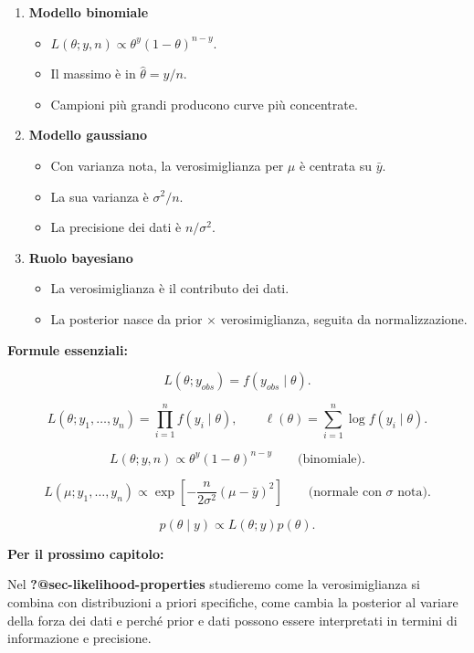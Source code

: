 \documentclass[
  italian,
  letterpaper,
  a4paper,
  11pt,
  open=any]{scrbook}
\providecommand{\tightlist}{%
  \setlength{\itemsep}{0pt}\setlength{\parskip}{0pt}}
\theoremstyle{plain}
\theoremstyle{definition}
\theoremstyle{definition}
\theoremstyle{remark}
\begin{document}
\begin{tcolorbox}
\begin{enumerate}
  \begin{itemize}
  \tightlist
  \item
    Le verosimiglianze si moltiplicano.
  \item
    Le log-verosimiglianze si sommano.
  \end{itemize}
\item
  \textbf{Modello binomiale}

  \begin{itemize}
  \tightlist
  \item
    \(L(\theta; y,n) \propto \theta^y(1-\theta)^{n-y}\).
  \item
    Il massimo è in \(\hat{\theta}=y/n\).
  \item
    Campioni più grandi producono curve più concentrate.
  \end{itemize}
\item
  \textbf{Modello gaussiano}

  \begin{itemize}
  \tightlist
  \item
    Con varianza nota, la verosimiglianza per \(\mu\) è centrata su
    \(\bar{y}\).
  \item
    La sua varianza è \(\sigma^2/n\).
  \item
    La precisione dei dati è \(n/\sigma^2\).
  \end{itemize}
\item
  \textbf{Ruolo bayesiano}

  \begin{itemize}
  \tightlist
  \item
    La verosimiglianza è il contributo dei dati.
  \item
    La posterior nasce da prior \(\times\) verosimiglianza, seguita da
    normalizzazione.
  \end{itemize}
\end{enumerate}

\textbf{Formule essenziali:}

\[
L(\theta; y_{obs}) = f(y_{obs}\mid\theta).
\]

\[
L(\theta; y_1,\ldots,y_n)
= \prod_{i=1}^{n} f(y_i\mid\theta),
\qquad
\ell(\theta)=\sum_{i=1}^{n}\log f(y_i\mid\theta).
\]

\[
L(\theta; y,n) \propto \theta^y(1-\theta)^{n-y}
\qquad \text{(binomiale)}.
\]

\[
L(\mu; y_1,\ldots,y_n)
\propto
\exp\left[-\frac{n}{2\sigma^2}(\mu-\bar{y})^2\right]
\qquad \text{(normale con }\sigma\text{ nota)}.
\]

\[
p(\theta\mid y) \propto L(\theta; y)p(\theta).
\]

\textbf{Per il prossimo capitolo:}

Nel \textbf{?@sec-likelihood-properties} studieremo come la
verosimiglianza si combina con distribuzioni a priori specifiche, come
cambia la posterior al variare della forza dei dati e perché prior e
dati possono essere interpretati in termini di informazione e
precisione.

\end{tcolorbox}
\end{document}
